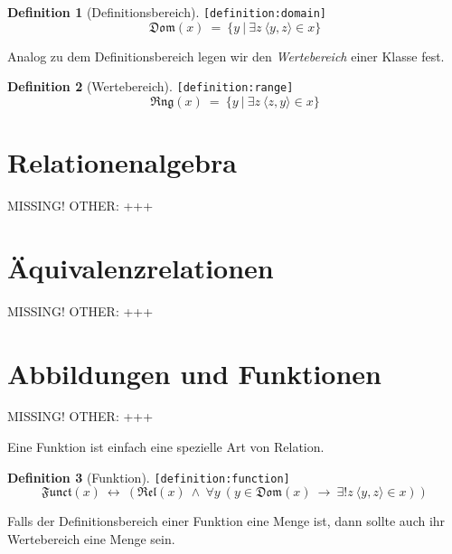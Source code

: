 \documentclass[a4paper,german,10pt,twoside]{book}
\theoremstyle{definition}
\newtheorem{defn}{Definition}
\theoremstyle{remark}
\begin{document}
\begin{defn}[Definitionsbereich]
\label{definition:domain} \hypertarget{definition:domain}{}
{\tt \tiny [\verb]definition:domain]]}
$$\mathfrak{Dom}(x) \ = \ \{ y \ | \ \exists z\ \langle y, z \rangle \in x \} $$
\end{defn}


\par
Analog zu dem Definitionsbereich legen wir den \emph{Wertebereich} einer Klasse fest.

\begin{defn}[Wertebereich]
\label{definition:range} \hypertarget{definition:range}{}
{\tt \tiny [\verb]definition:range]]}
$$\mathfrak{Rng}(x) \ = \ \{ y \ | \ \exists z\ \langle z, y \rangle \in x \} $$
\end{defn}


\section{Relationenalgebra} \label{chapter5_section5} \hypertarget{chapter5_section5}{}
MISSING! OTHER: +++

\section{{\"A}quivalenzrelationen} \label{chapter5_section6} \hypertarget{chapter5_section6}{}
MISSING! OTHER: +++

\section{Abbildungen und Funktionen} \label{chapter5_section7} \hypertarget{chapter5_section7}{}
MISSING! OTHER: +++

\par
Eine Funktion ist einfach eine spezielle Art von Relation.

\begin{defn}[Funktion]
\label{definition:function} \hypertarget{definition:function}{}
{\tt \tiny [\verb]definition:function]]}
$$\mathfrak{Funct}(x)\ \leftrightarrow\ (\mathfrak{Rel}(x)\ \land\ \forall y\ (y \in \mathfrak{Dom}(x)\ \rightarrow\ \exists! z\ \langle y, z \rangle \in x))$$

\end{defn}


\par
Falls der Definitionsbereich einer Funktion eine Menge ist, dann sollte auch ihr Wertebereich eine Menge sein.
\end{document}
